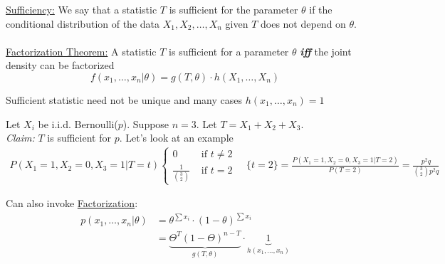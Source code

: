 \underline{Sufficiency:} We say that a statistic $T$ is sufficient for the parameter $\theta$ if the conditional distribution of the data $X_1, X_2, \ldots, X_n$ given $T$ does not depend on $\theta$.\\\\
\underline{Factorization Theorem:} A statistic $T$ is sufficient for a parameter $\theta$ \textbf{\textit{iff}} the joint density can be factorized
\begin{equation*}
	f(x_1, \ldots, x_n | \theta) = g(T, \theta) \cdot h(X_1, \ldots, X_n)
\end{equation*}
\begin{remark}
	Sufficient statistic need not be unique and many cases $h(x_1, \ldots, x_n) = 1$
\end{remark}
\begin{example-N}
	Let $X_i$ be i.i.d. Bernoulli($p$). Suppose $n = 3$. Let $T = X_1 + X_2 + X_3$.\\
	\emph{Claim:} $T$ is sufficient for $p$. Let's look at an example
	\begin{gather*}
		P(X_1 = 1, X_2 = 0, X_3 = 1 | T = t)
		\begin{cases}
			0 & \text{ if } t \neq 2\\
			\frac{1}{\binom{3}{2}} & \text{ if } t = 2
		\end{cases} \quad \{t = 2\} = \frac{P(X_1 = 1, X_2 = 0, X_3 = 1 | T = 2)}{P(T = 2)} = \frac{p^2q}{\binom{3}{2} p^2q}
	\end{gather*}
\end{example-N}
Can also invoke \underline{Factorization}: 
\begin{align*}
	p(x_1, \ldots, x_n | \theta) & = \theta^{\sum x_i} \cdot (1-\theta)^{\sum x_i}\\
	& = \underbrace{\Theta^T (1 - \Theta)^{n-T}}_{g(T, \theta)} \cdot \underbrace{1}_{h(x_1, \ldots, x_n)}
\end{align*}
